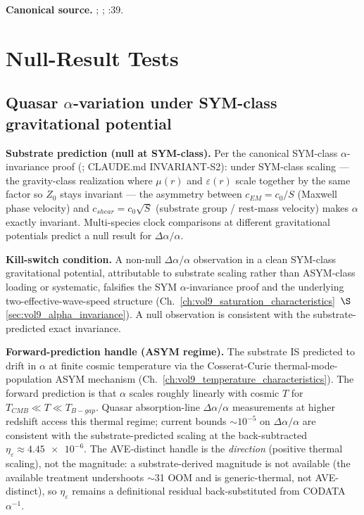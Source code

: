 \textbf{Canonical source.} ; ; :39.

\section{Null-Result Tests}
\label{sec:vol9_null_result_tests}

\subsection{Quasar $\alpha$-variation under SYM-class gravitational potential}
\label{subsec:vol9_quasar_alpha_null}

\textbf{Substrate prediction (null at SYM-class).} Per the canonical SYM-class $\alpha$-invariance proof (; CLAUDE.md INVARIANT-S2): under SYM-class scaling --- the gravity-class realization where $\mu(r)$ and $\varepsilon(r)$ scale together by the same factor so $Z_0$ stays invariant --- the asymmetry between $c_{EM} = c_0/S$ (Maxwell phase velocity) and $c_{shear} = c_0\sqrt{S}$ (substrate group / rest-mass velocity) makes $\alpha$ exactly invariant. Multi-species clock comparisons at different gravitational potentials predict a null result for $\Delta\alpha/\alpha$.

\textbf{Kill-switch condition.} A non-null $\Delta\alpha/\alpha$ observation in a clean SYM-class gravitational potential, attributable to substrate scaling rather than ASYM-class loading or systematic, falsifies the SYM $\alpha$-invariance proof and the underlying two-effective-wave-speed structure (Ch.~\ref{ch:vol9_saturation_characteristics}~$\S$\ref{sec:vol9_alpha_invariance}). A null observation is consistent with the substrate-predicted exact invariance.

\textbf{Forward-prediction handle (ASYM regime).} The substrate IS predicted to drift in $\alpha$ at finite cosmic temperature via the Cosserat-Curie thermal-mode-population ASYM mechanism (Ch.~\ref{ch:vol9_temperature_characteristics}). The forward prediction is that $\alpha$ scales roughly linearly with cosmic $T$ for $T_{CMB} \ll T \ll T_{B-gap}$. Quasar absorption-line $\Delta\alpha/\alpha$ measurements at higher redshift access this thermal regime; current bounds $\sim 10^{-5}$ on $\Delta\alpha/\alpha$ are consistent with the substrate-predicted scaling at the back-subtracted $\eta_\varepsilon \approx \num{4.45e-6}$. The AVE-distinct handle is the \emph{direction} (positive thermal scaling), not the magnitude: a substrate-derived magnitude is not available (the available treatment undershoots $\sim$31 OOM and is generic-thermal, not AVE-distinct), so $\eta_\varepsilon$ remains a definitional residual back-substituted from CODATA $\alpha^{-1}$.

